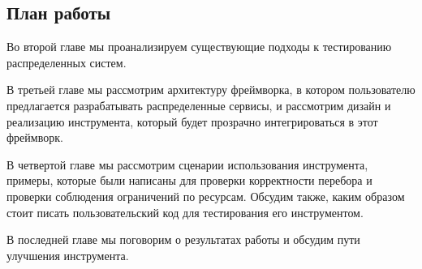 \subsection{План работы}

Во второй главе мы проанализируем существующие подходы к тестированию распределенных систем.

В третьей главе мы рассмотрим архитектуру фреймворка, в котором пользователю предлагается разрабатывать распределенные сервисы, и рассмотрим дизайн и реализацию инструмента, который будет прозрачно интегрироваться в этот фреймворк.

В четвертой главе мы рассмотрим сценарии использования инструмента, примеры, которые были написаны для проверки корректности перебора и проверки соблюдения ограничений по ресурсам. Обсудим также, каким образом стоит писать пользовательский код для тестирования его инструментом.

В последней главе мы поговорим о результатах работы и обсудим пути улучшения инструмента.
